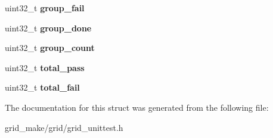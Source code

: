 \begin{DoxyCompactItemize}
\item 
\hypertarget{structgrid__unittest__model_ac63a80b161d7a321eca2a08817305713}{uint32\-\_\-t {\bfseries group\-\_\-fail}}\label{structgrid__unittest__model_ac63a80b161d7a321eca2a08817305713}

\item 
\hypertarget{structgrid__unittest__model_ad515859a5ef0d01c3b80b8a30215fcae}{uint32\-\_\-t {\bfseries group\-\_\-done}}\label{structgrid__unittest__model_ad515859a5ef0d01c3b80b8a30215fcae}

\item 
\hypertarget{structgrid__unittest__model_a0fa7ae74dc6bc34e40b612fcecf37ae0}{uint32\-\_\-t {\bfseries group\-\_\-count}}\label{structgrid__unittest__model_a0fa7ae74dc6bc34e40b612fcecf37ae0}

\item 
\hypertarget{structgrid__unittest__model_ad659350aac4c3421c46024ca372f4bf7}{uint32\-\_\-t {\bfseries total\-\_\-pass}}\label{structgrid__unittest__model_ad659350aac4c3421c46024ca372f4bf7}

\item 
\hypertarget{structgrid__unittest__model_a4f1be9d6de50873d55e8e6cb638c05b0}{uint32\-\_\-t {\bfseries total\-\_\-fail}}\label{structgrid__unittest__model_a4f1be9d6de50873d55e8e6cb638c05b0}

\end{DoxyCompactItemize}


The documentation for this struct was generated from the following file\-:\begin{DoxyCompactItemize}
\item 
grid\-\_\-make/grid/grid\-\_\-unittest.\-h\end{DoxyCompactItemize}
